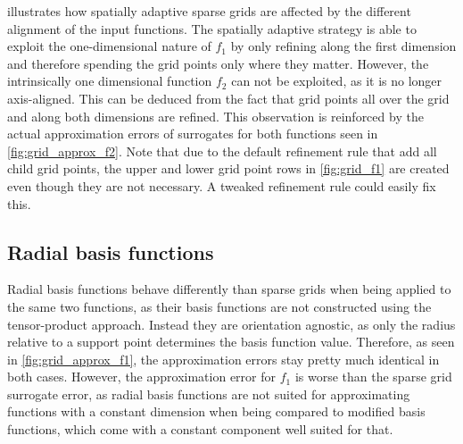 \documentclass[
  a4paper,  %
  twoside,  %
  bibliography=totoc,
  headsepline,
  cleardoublepage=empty,
  parskip=half,
  draft=false
]{scrbook}
\begin{document}
%
 illustrates how spatially adaptive sparse grids are affected by the different alignment of the input functions.
The spatially adaptive strategy is able to exploit the one-dimensional nature of $f_1$ by only refining along the first dimension and therefore spending the grid points only where they matter.
However, the intrinsically one dimensional function $f_2$ can not be exploited, as it is no longer axis-aligned.
This can be deduced from the fact that grid points all over the grid and along both dimensions are refined.
This observation is reinforced by the actual approximation errors of surrogates for both functions seen in \cref{fig:grid_approx_f2}.
Note that due to the default refinement rule that add all child grid points, the upper and lower grid point rows in \cref{fig:grid_f1} are created even though they are not necessary.
A tweaked refinement rule could easily fix this.

\subsection{Radial basis functions}

Radial basis functions behave differently than sparse grids when being applied to the same two functions, as their basis functions are not constructed using the tensor-product approach.
Instead they are orientation agnostic, as only the radius relative to a support point determines the basis function value.
Therefore, as seen in \cref{fig:grid_approx_f1}, the approximation errors stay pretty much identical in both cases.
However, the approximation error for $f_1$ is worse than the sparse grid surrogate error, as radial basis functions are not suited for approximating functions with a constant dimension when being compared to modified basis functions, which come with a constant component well suited for that.
\end{document}
